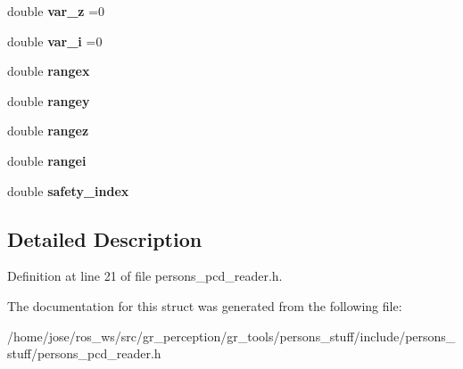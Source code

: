 \begin{DoxyCompactItemize}
double {\bfseries var\+\_\+z} =0
\item 
\mbox{\label{structpersons__stuff_1_1PersonInfo_a3d7ebe7a90fa5c8bf49f4a54f680a930}} 
double {\bfseries var\+\_\+i} =0
\item 
\mbox{\label{structpersons__stuff_1_1PersonInfo_acac34b067d2a708eb0971ac88f0ebbd3}} 
double {\bfseries rangex}
\item 
\mbox{\label{structpersons__stuff_1_1PersonInfo_a2d3ec6f22a0b5f8df0d4270db9cf0524}} 
double {\bfseries rangey}
\item 
\mbox{\label{structpersons__stuff_1_1PersonInfo_a2a7b1d5540015f251733ca30987c174e}} 
double {\bfseries rangez}
\item 
\mbox{\label{structpersons__stuff_1_1PersonInfo_ad5ebabeaba0cee6184ab3bffecf9abeb}} 
double {\bfseries rangei}
\item 
\mbox{\label{structpersons__stuff_1_1PersonInfo_a432e1f1582437ea49155fdb58b50df85}} 
double {\bfseries safety\+\_\+index}
\end{DoxyCompactItemize}


\subsection{Detailed Description}


Definition at line 21 of file persons\+\_\+pcd\+\_\+reader.\+h.



The documentation for this struct was generated from the following file\+:\begin{DoxyCompactItemize}
\item 
/home/jose/ros\+\_\+ws/src/gr\+\_\+perception/gr\+\_\+tools/persons\+\_\+stuff/include/persons\+\_\+stuff/persons\+\_\+pcd\+\_\+reader.\+h\end{DoxyCompactItemize}
